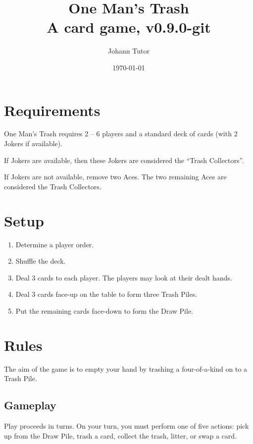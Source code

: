 \documentclass{article}
\newcommand\theversion{0.9.0-git}
\newcommand\thegame{One Man's Trash}
\begin{document}
\title{\thegame{}\\ \large A card game, v\theversion}
\author{Johann Tutor}
\date{\today}
\maketitle

\tableofcontents

\newpage

\section{Requirements}
\label{sec:requirements}

\thegame{} requires 2 -- 6 players and a standard deck of cards (with 2 Jokers if available).

If Jokers are available, then these Jokers are considered the ``Trash Collectors''.

If Jokers are not available, remove two Aces.
The two remaining Aces are considered the Trash Collectors.

\section{Setup}
\label{sec:setup}

\begin{enumerate}
  \item Determine a player order.
  \item Shuffle the deck.
  \item Deal 3 cards to each player. The players may look at their dealt hands.
  \item Deal 3 cards face-up on the table to form three Trash Piles.
  \item Put the remaining cards face-down to form the Draw Pile.
\end{enumerate}

\section{Rules}
\label{sec:rules}

The aim of the game is to empty your hand by trashing a four-of-a-kind on to a Trash Pile.

\subsection{Gameplay}
\label{sec:gameplay}

Play proceeds in turns. On your turn, you must perform one of five actions: pick up from the Draw Pile, trash a card, collect the trash, litter, or swap a card.
\end{document}
